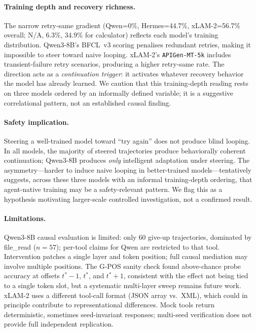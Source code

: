 \documentclass{article}
\begin{document}
\paragraph{Training depth and recovery richness.}
The narrow retry-same gradient (Qwen=0\%, Hermes=44.7\%,
xLAM-2=56.7\% overall; N/A, 6.3\%, 34.9\% for calculator) reflects
each model's training distribution.
Qwen3-8B's BFCL~v3 scoring penalises redundant retries, making it
impossible to steer toward naive looping.
xLAM-2's \texttt{APIGen-MT-5k} includes transient-failure retry
scenarios, producing a higher retry-same rate.
The direction acts as a \emph{continuation trigger}: it activates
whatever recovery behavior the model has already learned.
We caution that this training-depth reading rests on three models
ordered by an informally defined variable; it is a suggestive
correlational pattern, not an established causal finding.

\paragraph{Safety implication.}
Steering a well-trained model toward ``try again'' does not produce
blind looping.  In all models, the majority of steered trajectories
produce behaviorally coherent continuation; Qwen3-8B produces
\emph{only} intelligent adaptation under steering.
The asymmetry---harder to induce naive looping in better-trained
models---tentatively suggests, across these three models with an
informal training-depth ordering, that agent-native training may
be a safety-relevant pattern. We flag this as a hypothesis motivating
larger-scale controlled investigation, not a confirmed result.

\paragraph{Limitations.}
Qwen3-8B causal evaluation is limited: only 60 give-up trajectories,
dominated by file\_read ($n{=}57$); per-tool claims for Qwen are
restricted to that tool.
Intervention patches a single layer and token position; full causal
mediation may involve multiple positions. The G-POS sanity check found
above-chance probe accuracy at offsets $t^*{-}1$, $t^*$, and
$t^*{+}1$, consistent with the effect not being tied to a single
token slot, but a systematic multi-layer sweep remains future work.
xLAM-2 uses a different tool-call format (JSON array vs.\ XML), which
could in principle contribute to representational differences.
Mock tools return deterministic, sometimes seed-invariant responses;
multi-seed verification does not provide full independent replication.
\end{document}
